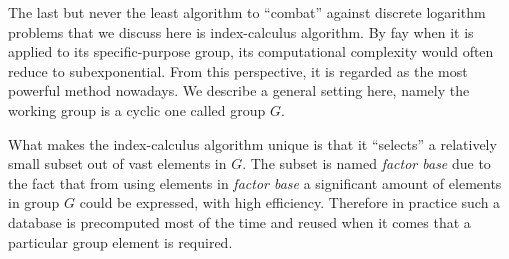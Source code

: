 \documentclass[12pt,journal,compsoc]{IEEEtran}
\begin{document}
The last but never the least algorithm to ``combat'' against discrete
logarithm problems that we discuss here is index-calculus
algorithm. By fay when it is applied to its specific-purpose group,
its computational complexity would often reduce to
subexponential. From this perspective, it is regarded as the most
powerful method nowadays. We describe a general setting here, namely
the working group is a cyclic one called group $G$.
\par
What makes the index-calculus algorithm unique is that it ``selects''
a relatively small subset out of vast elements in $G$. The subset is
named \emph{factor base} due to the fact that from using elements in
\emph{factor base} a significant amount of elements in group $G$ could
be expressed, with high efficiency. Therefore in practice such a
database is precomputed most of the time and reused when it comes that
a particular group element is required.
\end{document}
